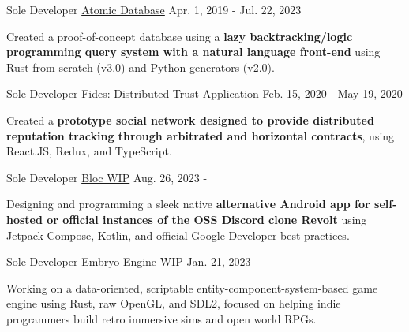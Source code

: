 

\begin{cventries}

  \cventry
    {Sole Developer} %
    {\href{https://github.com/alexispurslane/atomicdatabase}{Atomic Database}}
    {}
    {Apr. 1, 2019 - Jul. 22, 2023} %
    {
      \begin{cvitems} %
        \item {Created a proof-of-concept database using a \textbf{lazy backtracking/logic programming query system with a natural language front-end} using Rust from scratch (v3.0) and Python generators (v2.0).}
      \end{cvitems}
    }

    \cventry
    {Sole Developer} %
    {\href{https://github.com/alexispurslane/fides}{Fides: Distributed Trust Application}}
    {}
    {Feb. 15, 2020 - May 19, 2020} %
    {
      \begin{cvitems} %
        \item {Created a \textbf{prototype social network designed to provide distributed reputation tracking through arbitrated and horizontal contracts}, using React.JS, Redux, and TypeScript.}
      \end{cvitems}
    }

    \cventry
    {Sole Developer} %
    {\href{https://github.com/alexispurslane/bloc}{Bloc WIP}}
    {}
    {Aug. 26, 2023 - } %
    {
      \begin{cvitems} %
        \item {Designing and programming a sleek native \textbf{alternative Android app for self-hosted or official instances of the OSS Discord clone Revolt} using Jetpack Compose, Kotlin, and official Google Developer best practices.}
      \end{cvitems}
    }

    \cventry
    {Sole Developer}
    {\href{https://github.com/alexispurslane/embryo-engine}{Embryo Engine WIP}}
    {}
    {Jan. 21, 2023 - }
    {
      \begin{cvitems}
        \item {Working on a data-oriented, scriptable entity-component-system-based game engine using Rust, raw OpenGL, and SDL2, focused on helping indie programmers build retro immersive sims and open world RPGs.}
      \end{cvitems}
    }


\end{cventries}
